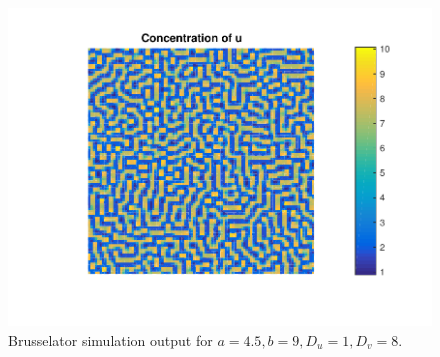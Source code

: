 \begin{figure}
\centering
\includegraphics[scale = 0.9]{./plots/cua4p5b9.pdf}
\caption{Brusselator simulation output for $a=4.5,b=9,D_u=1,D_v=8$.}
\label{fig:Brussl2}
\end{figure}




